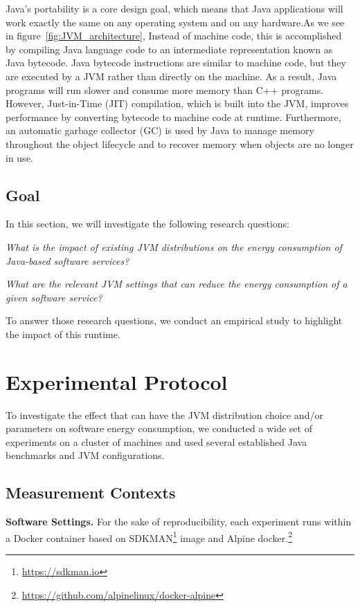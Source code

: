 Java's portability is a core design goal, which means that Java applications will work exactly the same on any operating system and on any hardware.As we see in figure~\ref{fig:JVM_architecture}, Instead of machine code, this is accomplished by compiling Java language code to an intermediate representation known as Java bytecode. Java bytecode instructions are similar to machine code, but they are executed by a JVM rather than directly on the machine. As a result, Java programs will run slower and consume more memory than C++ programs. However, Just-in-Time (JIT) compilation, which is built into the JVM, improves performance by converting bytecode to machine code at runtime. Furthermore, an automatic garbage collector (GC) is used by Java to manage memory throughout the object lifecycle and to recover memory when objects are no longer in use.

\subsection{Goal}
In this section, we will investigate the following research questions:
\begin{compactenum}[\indent\bf RQ\,1:]
    \item \emph{What is the impact of existing JVM distributions on the energy consumption of Java-based software services?}
    \item \emph{What are the relevant JVM settings that can reduce the energy consumption of a given software service?}
\end{compactenum}

To answer those research questions, we conduct an empirical study to highlight the impact of this runtime.

\section{Experimental Protocol}\label{sec:javaprotocol}
To investigate the effect that can have the JVM distribution choice and/or parameters on software energy consumption, we conducted a wide set of experiments on a cluster of machines and used several established Java benchmarks and JVM configurations.

\subsection{Measurement Contexts}

\noindent\textbf{Software Settings.}
For the sake of reproducibility, each experiment runs within a Docker container based on \textsf{SDKMAN}\footnote{\url{https://sdkman.io}} image and Alpine docker.\footnote{\url{https://github.com/alpinelinux/docker-alpine}}

